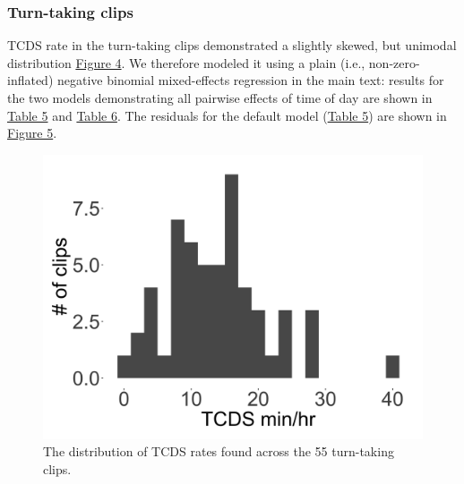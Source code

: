 \documentclass[,man,floatsintext]{apa6}
\begin{document}
\FloatBarrier

\subsubsection{Turn-taking clips}\label{models-tcds-turntaking}

TCDS rate in the turn-taking clips demonstrated a slightly skewed, but
unimodal distribution \protect\hyperlink{fig4}{Figure 4}. We therefore
modeled it using a plain (i.e., non-zero-inflated) negative binomial
mixed-effects regression in the main text: results for the two models
demonstrating all pairwise effects of time of day are shown in
\protect\hyperlink{tab5}{Table 5} and \protect\hyperlink{tab6}{Table 6}.
The residuals for the default model (\protect\hyperlink{tab5}{Table 5})
are shown in \protect\hyperlink{fig5}{Figure 5}.

\FloatBarrier

\begin{figure}[H]

{\centering \includegraphics[width=0.4\linewidth]{www/TCDS_turntaking_distribution} 

}

\caption{The distribution of TCDS rates found across the 55 turn-taking clips.}\label{fig:fig4}
\end{figure}

\FloatBarrier
\end{document}
